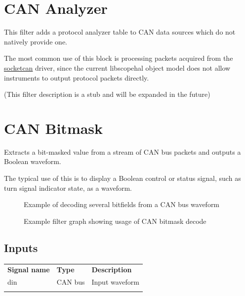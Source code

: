 \section{CAN Analyzer}
\label{filter:cananalyzer}

This filter adds a protocol analyzer table to CAN data sources which do not natively provide one.

The most common use of this block is processing packets acquired from the \hyperref[driver:socketcan]{socketcan}
driver, since the current libscopehal object model does not allow instruments to output protocol packets directly.

(This filter description is a stub and will be expanded in the future)

\pagebreak
\section{CAN Bitmask}
\label{filter:canbitmask}

Extracts a bit-masked value from a stream of CAN bus packets and outputs a Boolean waveform.

The typical use of this is to display a Boolean control or status signal, such as turn signal indicator state, as a
waveform.

\begin{figure}[h]
\centering
{}
\caption{Example of decoding several bitfields from a CAN bus waveform}
\label{filter_can}
\end{figure}

\begin{figure}[h]
\centering
{}
\caption{Example filter graph showing usage of CAN bitmask decode}
\label{filter_graph_can}
\end{figure}

\subsection{Inputs}

\begin{tabularx}{16cm}{llX}
\thickhline
\textbf{Signal name} & \textbf{Type} & \textbf{Description} \\
\thickhline
din & CAN bus & Input waveform \\
\thickhline
\end{tabularx}

